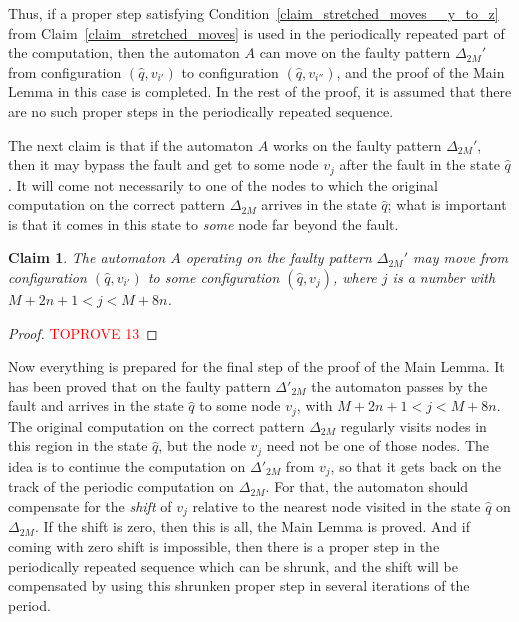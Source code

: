 \documentclass[12pt,a4paper]{article}
\newtheorem{claim}{Claim}
\theoremstyle{definition}
\begin{document}
Thus, if a proper step
satisfying Condition~\ref{claim_stretched_moves__y_to_z} from Claim~\ref{claim_stretched_moves}
is used in the periodically repeated part of the computation,
then the automaton $A$ can move on the faulty pattern $\Delta_{2M}'$
from configuration $(\widehat{q},v_{i'})$ to configuration $(\widehat{q},v_{i''})$,
and the proof of the Main Lemma in this case is completed.
In the rest of the proof,
it is assumed that there are no such proper steps in the periodically repeated sequence.

The next claim is that if the automaton $A$
works on the faulty pattern $\Delta_{2M}'$,
then it may bypass the fault and get to some node $v_j$ after the fault
in the state $\widehat{q}$.
It will come not necessarily to one of the nodes
to which the original computation on the correct pattern $\Delta_{2M}$
arrives in the state $\widehat{q}$;
what is important is that it comes in this state
to \emph{some} node far beyond the fault.

\begin{claim}\label{claim_passing_by_v_M_v_M_plus_1}
The automaton $A$ operating on the faulty pattern $\Delta_{2M}'$
may move from configuration $(\widehat{q},v_{i'})$
to some configuration $(\widehat{q}, v_j)$,
where $j$ is a number with $M+2n+1 < j < M+8n$.
\end{claim}
\begin{proof}\textcolor{red}{TOPROVE 13}\end{proof}

Now everything is prepared for the final step of the proof of the Main Lemma.
It has been proved that on the faulty pattern $\Delta'_{2M}$ the automaton 
passes by the fault
and arrives in the state $\widehat{q}$ to some node $v_j$,
with $M+2n+1 < j < M+8n$.
The original computation on the correct pattern $\Delta_{2M}$
regularly visits nodes in this region in the state $\widehat{q}$,
but the node $v_j$ need not be one of those nodes.
The idea is to continue the computation on $\Delta'_{2M}$ from $v_j$,
so that it gets back on the track
of the periodic computation on $\Delta_{2M}$.
For that, the automaton should compensate for the \emph{shift} of $v_j$
relative to the nearest node visited in the state $\widehat{q}$ on $\Delta_{2M}$.
If the shift is zero, then this is all, the Main Lemma is proved.
And if coming with zero shift is impossible,
then there is a proper step in the periodically repeated sequence which can be shrunk,
and the shift will be compensated
by using this shrunken proper step in several iterations of the period.
\end{document}
